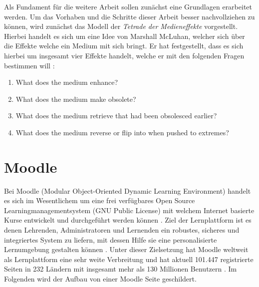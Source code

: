 \label{cha:grundlagen}
Als Fundament für die weitere Arbeit sollen zunächst eine Grundlagen erarbeitet werden. Um das Vorhaben und die Schritte dieser Arbeit besser nachvollziehen zu können, wird zunächst das Modell der \textit{Tetrade der Medieneffekte} vorgestellt. Hierbei handelt es sich um eine Idee von Marshall McLuhan, welcher sich über die Effekte welche ein Medium mit sich bringt. Er hat festgestellt, dass es sich hierbei um insgesamt vier Effekte handelt, welche er mit den folgenden Fragen bestimmen will \citep{mcluhan1977laws}:

\begin{enumerate}
\item What does the medium enhance?
\item What does the medium make obsolete?
\item What does the medium retrieve that had been obsolesced earlier?
\item What does the medium reverse or flip into when pushed to extremes?
\end{enumerate}



\section{Moodle}
\label{sec:moodle}
Bei Moodle (Modular Object-Oriented Dynamic Learning Environment) handelt es sich im Wesentlichem um eine frei verfügbares Open Source Learningmanagementsystem (GNU Public License) mit welchem Internet basierte Kurse entwickelt und durchgeführt werden können \citep{moodle2015was}. Ziel der Lernplattform ist es denen Lehrenden, Administratoren und Lernenden ein robustes, sicheres und integriertes System zu liefern, mit dessen Hilfe sie eine personalisierte Lernumgebung gestalten können \citep{moodle2018about}. Unter dieser Zielsetzung hat  Moodle weltweit als Lernplattform eine sehr weite Verbreitung und hat aktuell 101.447 registrierte Seiten in 232 Ländern mit insgesamt mehr als 130 Millionen Benutzern \citep{moodle2018stats}. Im Folgenden wird der Aufbau von einer Moodle Seite geschildert.

